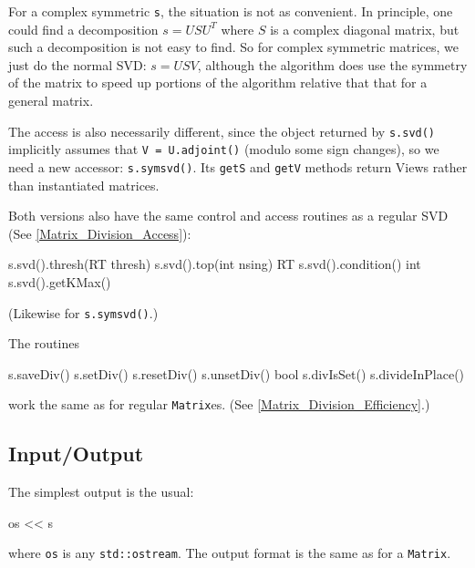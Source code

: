 \documentclass[twoside,letterpaper,11pt]{article}
\renewcommand{\tt}[1]{{\lstinline {#1}}}
\begin{document}
\begin{enumerate}
For a complex symmetric \tt{s}, the situation is not as convenient.
In principle, one could find a decomposition $s = USU^T$ where $S$ is 
a complex diagonal matrix, but such a decomposition is not easy to find. 
So for complex symmetric matrices, we
just do the normal SVD: $s = USV$, although the algorithm
does use the symmetry of the matrix to 
speed up portions of the algorithm relative that that for a general matrix.

The access is also necessarily different, since the object returned by 
\tt{s.svd()} implicitly assumes that \tt{V = U.adjoint()} (modulo some sign changes), 
so we need a 
new accessor: \tt{s.symsvd()}.  Its \tt{getS} and \tt{getV} methods return Views
rather than instantiated matrices.

Both versions also have the same control and access routines as a regular SVD
(See \ref{Matrix_Division_Access}):
\begin{tmvcode}
s.svd().thresh(RT thresh)
s.svd().top(int nsing)
RT s.svd().condition()
int s.svd().getKMax()
\end{tmvcode}
(Likewise for \tt{s.symsvd()}.)

\end{enumerate}
The routines 
\begin{tmvcode}
s.saveDiv()
s.setDiv()
s.resetDiv()
s.unsetDiv()
bool s.divIsSet()
s.divideInPlace()
\end{tmvcode}
work the same as for regular \tt{Matrix}es.
(See \ref{Matrix_Division_Efficiency}.)

\subsection{Input/Output}
\label{SymMatrix_IO}

The simplest output is the usual:
\begin{tmvcode}
os << s
\end{tmvcode}
where \tt{os} is any \tt{std::ostream}.
The output format is the same as for a \tt{Matrix}.
\end{document}
